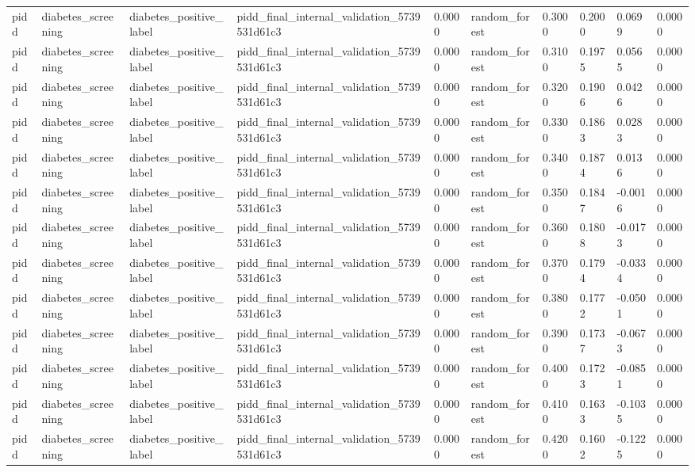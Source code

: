 \begin{tabular}{llllllllll}
pidd & diabetes\_screening & diabetes\_positive\_label & pidd\_final\_internal\_validation\_5739531d61c3 & 0.0000 & random\_forest & 0.3000 & 0.2000 & 0.0699 & 0.0000 \\
pidd & diabetes\_screening & diabetes\_positive\_label & pidd\_final\_internal\_validation\_5739531d61c3 & 0.0000 & random\_forest & 0.3100 & 0.1975 & 0.0565 & 0.0000 \\
pidd & diabetes\_screening & diabetes\_positive\_label & pidd\_final\_internal\_validation\_5739531d61c3 & 0.0000 & random\_forest & 0.3200 & 0.1906 & 0.0426 & 0.0000 \\
pidd & diabetes\_screening & diabetes\_positive\_label & pidd\_final\_internal\_validation\_5739531d61c3 & 0.0000 & random\_forest & 0.3300 & 0.1863 & 0.0283 & 0.0000 \\
pidd & diabetes\_screening & diabetes\_positive\_label & pidd\_final\_internal\_validation\_5739531d61c3 & 0.0000 & random\_forest & 0.3400 & 0.1874 & 0.0136 & 0.0000 \\
pidd & diabetes\_screening & diabetes\_positive\_label & pidd\_final\_internal\_validation\_5739531d61c3 & 0.0000 & random\_forest & 0.3500 & 0.1847 & -0.0016 & 0.0000 \\
pidd & diabetes\_screening & diabetes\_positive\_label & pidd\_final\_internal\_validation\_5739531d61c3 & 0.0000 & random\_forest & 0.3600 & 0.1808 & -0.0173 & 0.0000 \\
pidd & diabetes\_screening & diabetes\_positive\_label & pidd\_final\_internal\_validation\_5739531d61c3 & 0.0000 & random\_forest & 0.3700 & 0.1794 & -0.0334 & 0.0000 \\
pidd & diabetes\_screening & diabetes\_positive\_label & pidd\_final\_internal\_validation\_5739531d61c3 & 0.0000 & random\_forest & 0.3800 & 0.1772 & -0.0501 & 0.0000 \\
pidd & diabetes\_screening & diabetes\_positive\_label & pidd\_final\_internal\_validation\_5739531d61c3 & 0.0000 & random\_forest & 0.3900 & 0.1737 & -0.0673 & 0.0000 \\
pidd & diabetes\_screening & diabetes\_positive\_label & pidd\_final\_internal\_validation\_5739531d61c3 & 0.0000 & random\_forest & 0.4000 & 0.1723 & -0.0851 & 0.0000 \\
pidd & diabetes\_screening & diabetes\_positive\_label & pidd\_final\_internal\_validation\_5739531d61c3 & 0.0000 & random\_forest & 0.4100 & 0.1633 & -0.1035 & 0.0000 \\
pidd & diabetes\_screening & diabetes\_positive\_label & pidd\_final\_internal\_validation\_5739531d61c3 & 0.0000 & random\_forest & 0.4200 & 0.1602 & -0.1225 & 0.0000 \\

\end{tabular}
